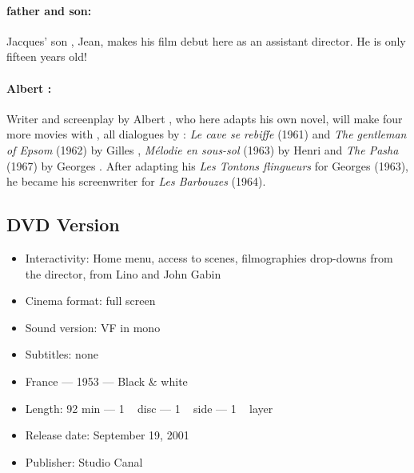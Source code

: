 \paragraph{ father and son:} Jacques' son
 , Jean, makes his film debut here as an assistant
director. He is only fifteen years old!
\paragraph{Albert :} Writer and screenplay by Albert
, who here adapts  his own novel, will make four more movies with , all dialogues by : \emph{Le cave se rebiffe} (1961) and \emph{The gentleman of Epsom} (1962) by Gilles , \emph{Mélodie en sous-sol} (1963) by Henri
 and \emph{The Pasha} (1967) by Georges . After adapting his \emph{Les Tontons flingueurs} for Georges  (1963), he became his screenwriter for \emph{Les Barbouzes}
(1964).

\subsection*{DVD Version}

\begin{itemize}
    \item Interactivity: Home menu, access to scenes, filmographies
drop-downs from the director, from Lino  and John
    \familyname Gabin{}
    \item Cinema format: full screen
    \item Sound version: VF in mono
    \item Subtitles: none
    \item France --- 1953 --- Black \& white
     \item Length: 92 min --- 1 ~ disc --- 1 ~ side --- 1 ~ layer
    \item Release date: September 19, 2001
    \item Publisher: Studio Canal
\end{itemize}
